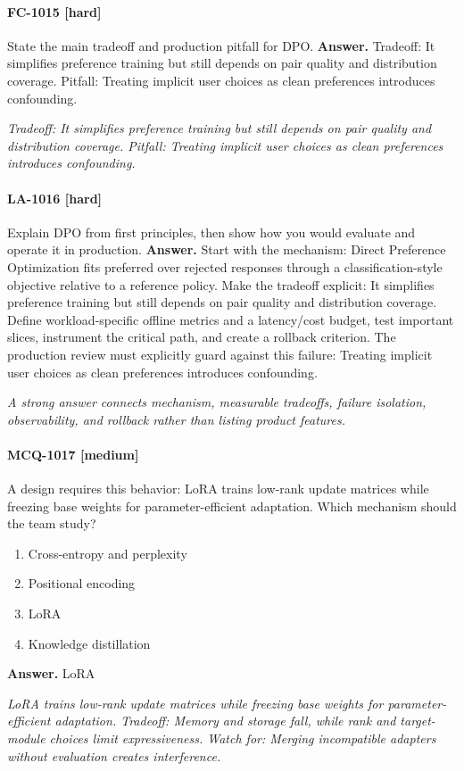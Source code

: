 \paragraph{FC-1015 [hard]} State the main tradeoff and production pitfall for DPO.
\noindent\textbf{Answer.} Tradeoff: It simplifies preference training but still depends on pair quality and distribution coverage. Pitfall: Treating implicit user choices as clean preferences introduces confounding.
\par\textit{Tradeoff: It simplifies preference training but still depends on pair quality and distribution coverage. Pitfall: Treating implicit user choices as clean preferences introduces confounding.}
\paragraph{LA-1016 [hard]} Explain DPO from first principles, then show how you would evaluate and operate it in production.
\noindent\textbf{Answer.} Start with the mechanism: Direct Preference Optimization fits preferred over rejected responses through a classification-style objective relative to a reference policy. Make the tradeoff explicit: It simplifies preference training but still depends on pair quality and distribution coverage. Define workload-specific offline metrics and a latency/cost budget, test important slices, instrument the critical path, and create a rollback criterion. The production review must explicitly guard against this failure: Treating implicit user choices as clean preferences introduces confounding.
\par\textit{A strong answer connects mechanism, measurable tradeoffs, failure isolation, observability, and rollback rather than listing product features.}
\paragraph{MCQ-1017 [medium]} A design requires this behavior: LoRA trains low-rank update matrices while freezing base weights for parameter-efficient adaptation. Which mechanism should the team study?
\begin{enumerate}[label=\Alph*.]
\item Cross-entropy and perplexity
\item Positional encoding
\item LoRA
\item Knowledge distillation
\end{enumerate}
\noindent\textbf{Answer.} LoRA
\par\textit{LoRA trains low-rank update matrices while freezing base weights for parameter-efficient adaptation. Tradeoff: Memory and storage fall, while rank and target-module choices limit expressiveness. Watch for: Merging incompatible adapters without evaluation creates interference.}
